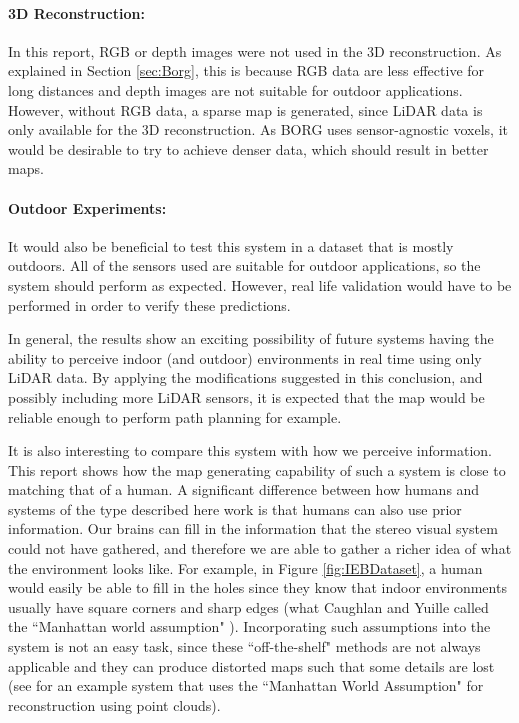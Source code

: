 \documentclass[11pt]{article}
\begin{document}
\paragraph{3D Reconstruction: } In this report, RGB or depth images were not used in the 3D reconstruction. As explained in Section \ref{sec:Borg}, this is because RGB data are less effective for long distances and depth images are not suitable for outdoor applications. However, without RGB data, a sparse map is generated, since LiDAR data is only available for the 3D reconstruction. As BORG uses sensor-agnostic voxels, it would be desirable to try to achieve denser data, which should result in better maps.
	
\paragraph{Outdoor Experiments: } It would also be beneficial to test this system in a dataset that is mostly outdoors. All of the sensors used are suitable for outdoor applications, so the system should perform as expected. However, real life validation would have to be performed in order to verify these predictions.

In general, the results show an exciting possibility of future systems having the ability to perceive indoor (and outdoor) environments in real time using only LiDAR data. By applying the modifications suggested in this conclusion, and possibly including more LiDAR sensors, it is expected that the map would be reliable enough to perform path planning for example.

It is also interesting to compare this system with how we perceive information. This report shows how the map generating capability of such a system is close to matching that of a human. A significant difference between how humans and systems of the type described here work is that humans can also use prior information. Our brains can fill in the information that the stereo visual system could not have gathered, and therefore we are able to gather a richer idea of what the environment looks like. For example, in Figure \ref{fig:IEBDataset}, a human would easily be able to fill in the holes since they know that indoor environments usually have square corners and sharp edges (what Caughlan and Yuille called the ``Manhattan world assumption" \cite{coughlan1999manhattan}). Incorporating such assumptions into the system is not an easy task, since these ``off-the-shelf" methods are not always applicable and they can produce distorted maps such that some details are lost (see \cite{li2016boxfitting} for an example system that uses the ``Manhattan World Assumption" for reconstruction using point clouds).
 
\end{document}
